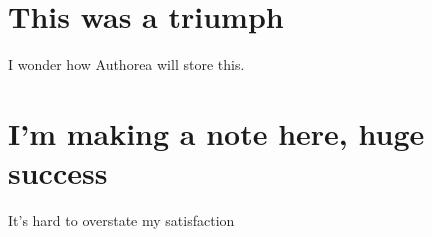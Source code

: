 \section{This was a triumph}

I wonder how Authorea will store this.

\section{I'm making a note here, huge success}

It's hard to overstate my satisfaction
  